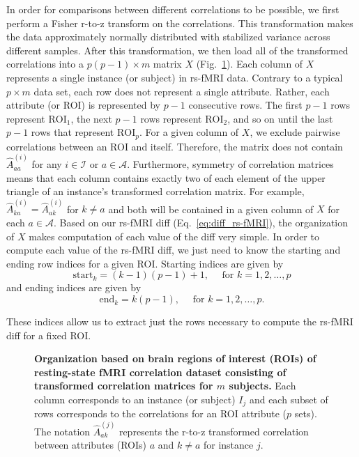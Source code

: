 \documentclass[10pt,letterpaper]{article}
\begin{document}
In order for comparisons between different correlations to be possible, we first perform a Fisher r-to-z transform on the correlations. This transformation makes the data approximately normally distributed with stabilized variance across different samples. After this transformation, we then load all of the transformed correlations into a $p(p-1) \times m$ matrix $X$ (Fig.~\ref{fig:rs-fMRI_matrix}). Each column of $X$ represents a single instance (or subject) in rs-fMRI data. Contrary to a typical $p \times m$ data set, each row does not represent a single attribute. Rather, each attribute (or ROI) is represented by $p - 1$ consecutive rows. The first $p - 1$ rows represent $\text{ROI}_1$, the next $p - 1$ rows represent $\text{ROI}_2$, and so on until the last $p - 1$ rows that represent $\text{ROI}_p$. For a given column of $X$, we exclude pairwise correlations between an ROI and itself. Therefore, the matrix does not contain $\hat{A}^{(i)}_{aa}$ for any $i \in \mathcal{I}$ or $a \in \mathcal{A}$. Furthermore, symmetry of correlation matrices means that each column contains exactly two of each element of the upper triangle of an instance's transformed correlation matrix. For example, $\hat{A}^{(i)}_{ka} = \hat{A}^{(i)}_{ak}$ for $k \neq a$ and both will be contained in a given column of $X$ for each $a \in \mathcal{A}$. Based on our rs-fMRI diff (Eq.~\ref{eq:diff_rs-fMRI}), the organization of $X$ makes computation of each value of the diff very simple. In order to compute each value of the rs-fMRI diff, we just need to know the starting and ending row indices for a given ROI. Starting indices are given by
%
\[
\text{start}_k = (k - 1)(p - 1) + 1, \quad \text{ for } k = 1,2,\dots,p
\]
%
and ending indices are given by
%
\[
\text{end}_k = k(p - 1), \quad \text{ for } k = 1,2,\dots,p.
\]

These indices allow us to extract just the rows necessary to compute the rs-fMRI diff for a fixed ROI. 

\begin{figure}[H]
	\centering
	\caption{{\bf Organization based on brain regions of interest (ROIs) of resting-state fMRI correlation dataset consisting of transformed correlation matrices for $m$ subjects.} Each column corresponds to an instance (or subject) $I_j$ and each subset of rows corresponds to the correlations for an ROI attribute ($p$ sets). The notation $\hat{A}^{(j)}_{ak}$ represents the r-to-z transformed correlation between attributes (ROIs) $a$ and $k \neq a$ for instance $j$.}\label{fig:rs-fMRI_matrix}
\end{figure}
\end{document}
